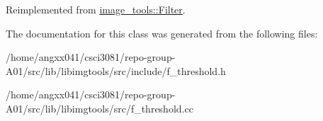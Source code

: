 Reimplemented from \hyperlink{classimage__tools_1_1Filter_afd5d1be5736e343077d331896d4130d9}{image\+\_\+tools\+::\+Filter}.



The documentation for this class was generated from the following files\+:\begin{DoxyCompactItemize}
\item 
/home/angxx041/csci3081/repo-\/group-\/\+A01/src/lib/libimgtools/src/include/f\+\_\+threshold.\+h\item 
/home/angxx041/csci3081/repo-\/group-\/\+A01/src/lib/libimgtools/src/f\+\_\+threshold.\+cc\end{DoxyCompactItemize}

